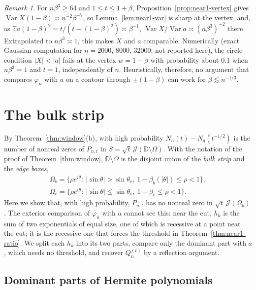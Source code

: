 \documentclass[11pt]{amsart}
\theoremstyle{definition}
\theoremstyle{remark}
\newtheorem{remark}[theorem]{Remark}
\numberwithin{equation}{section}
\newcommand{\D}{\mathbb{D}}
\newcommand{\E}{\mathbb{E}}
\begin{document}
\begin{remark}\label{rem:near1-vertex}
For $n\beta^3\ge64$ and $1\le t\le1+\beta$, Proposition~\ref{prop:near1-vertex} gives $\operatorname{Var}X(1-\beta)\asymp n^{-2}\beta^{-7}$, so Lemma~\ref{lem:near1-var} is sharp at the vertex, and, as $\E a(1-\beta)^2=t/(t-(1-\beta)^2)\asymp\beta^{-1}$, $\operatorname{Var}X/\operatorname{Var}a\asymp(n\beta^3)^{-2}$ there. Extrapolated to $n\beta^3\asymp1$, this makes $X$ and $a$ comparable. Numerically (exact Gaussian computation for $n=2000$, $8000$, $32000$; not reported here), the circle condition $|X|<|a|$ fails at the vertex $w=1-\beta$ with probability about $0.1$ when $n\beta^3=1$ and $t=1$, independently of $n$. Heuristically, therefore, no argument that compares $\varphi_n$ with $a$ on a contour through $\pm(1-\beta)$ can work for $\beta\lesssim n^{-1/3}$.
\end{remark}

\section{The bulk strip}\label{sec:bulk}\label{subsec:near1-bulk}
By Theorem~\ref{thm:window}(b), with high probability $N_n(t)-N_q(t^{-1/2})$ is the number of nonreal zeros of $P_{n,t}$ in $S=\sqrt t\,\mathcal J(\D\setminus\Omega)$. With the notation of the proof of Theorem~\ref{thm:window}, $\D\setminus\Omega$ is the disjoint union of the \emph{bulk strip} and the \emph{edge boxes},
\begin{gather*}
\Omega_b=\{\rho e^{i\theta}:\ |\sin\theta|>\sin\theta_e,\ 1-\beta_b(|\theta|)\le\rho<1\},\\
\Omega_e=\{\rho e^{i\theta}:\ |\sin\theta|\le\sin\theta_e,\ 1-\beta_e\le\rho<1\}.
\end{gather*}
Here we show that, with high probability, $P_{n,t}$ has no nonreal zero in $\sqrt t\,\mathcal J(\Omega_b)$. The exterior comparison of $\varphi_n$ with $a$ cannot see this: near the cut, $h_k$ is the sum of two exponentials of equal size, one of which is recessive at a point near the cut; it is the recessive one that forces the threshold in Theorem~\ref{thm:near1-ratio}. We split each $h_k$ into its two parts, compare only the dominant part with $a$, which needs no threshold, and recover $Q_n^{(t)}$ by a reflection argument.

\subsection{Dominant parts of Hermite polynomials}
\end{document}
